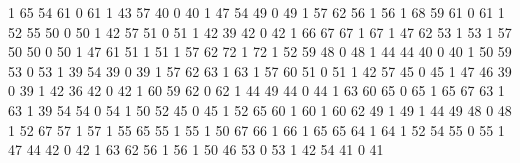 \documentclass[a4paper,10pt]{article}
\begin{document}
\begin{eulernotebook}
\begin{eulercomment}
\begin{eulercomment}
\begin{eulercomment}
\begin{eulercomment}
\begin{eulercomment}
\begin{eulercomment}
\begin{eulercomment}
\begin{eulercomment}
\begin{euleroutput}
           1        65        54        61         0          61
           1        43        57        40         0          40
           1        47        54        49         0          49
           1        57        62        56         1          56
           1        68        59        61         0          61
           1        52        55        50         0          50
           1        42        57        51         0          51
           1        42        39        42         0          42
           1        66        67        67         1          67
           1        47        62        53         1          53
           1        57        50        50         0          50
           1        47        61        51         1          51
           1        57        62        72         1          72
           1        52        59        48         0          48
           1        44        44        40         0          40
           1        50        59        53         0          53
           1        39        54        39         0          39
           1        57        62        63         1          63
           1        57        60        51         0          51
           1        42        57        45         0          45
           1        47        46        39         0          39
           1        42        36        42         0          42
           1        60        59        62         0          62
           1        44        49        44         0          44
           1        63        60        65         0          65
           1        65        67        63         1          63
           1        39        54        54         0          54
           1        50        52        45         0          45
           1        52        65        60         1          60
           1        60        62        49         1          49
           1        44        49        48         0          48
           1        52        67        57         1          57
           1        55        65        55         1          55
           1        50        67        66         1          66
           1        65        65        64         1          64
           1        52        54        55         0          55
           1        47        44        42         0          42
           1        63        62        56         1          56
           1        50        46        53         0          53
           1        42        54        41         0          41

\end{euleroutput}
\end{eulercomment}
\end{eulercomment}
\end{eulercomment}
\end{eulercomment}
\end{eulercomment}
\end{eulercomment}
\end{eulercomment}
\end{eulercomment}
\end{eulernotebook}
\end{document}
